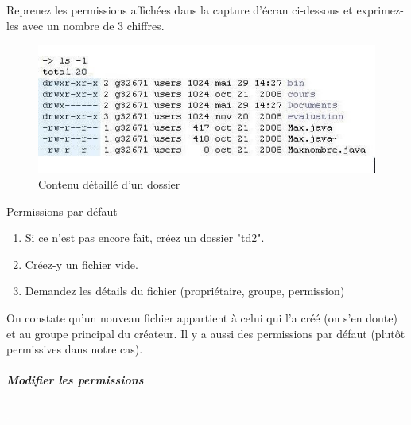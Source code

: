 \documentclass[a4paper,11pt]{style-esi/td}
\begin{document}
\begin{Exercice}{} 
	Reprenez les permissions affichées dans la capture d'écran ci-dessous 
et exprimez-les avec un nombre de 3 chiffres.  

\par
\begin{figure}[hbt]
	\begin{center}
		\includegraphics[width=0.8\linewidth,height=0.8\textheight,keepaspectratio=true]{image/ls-l-permissions.jpg}
		
	\end{center}
	
	\caption[Contenu détaillé d'un dossier]{Contenu détaillé d'un dossier}
\end{figure}
\end{Exercice}
		
		
\begin{Tutoriel}{Permissions par défaut} 	
		
		\begin{enumerate}
			
			\item Si ce n'est pas encore fait, créez un dossier "td2".
			\item Créez-y un fichier vide.
			\item Demandez les détails du fichier (propriétaire, groupe, permission)
		\end{enumerate}
		
		On constate qu'un nouveau fichier appartient à celui qui l'a créé 
		(on s'en doute) et au groupe principal du créateur. 
		Il y a aussi des permissions par défaut (plut\^ot permissives dans notre cas).  
		
		\par
\end{Tutoriel}		
		
		\subparagraph{Modifier les permissions} 

\textcolor{white}{.} \par
\end{document}
